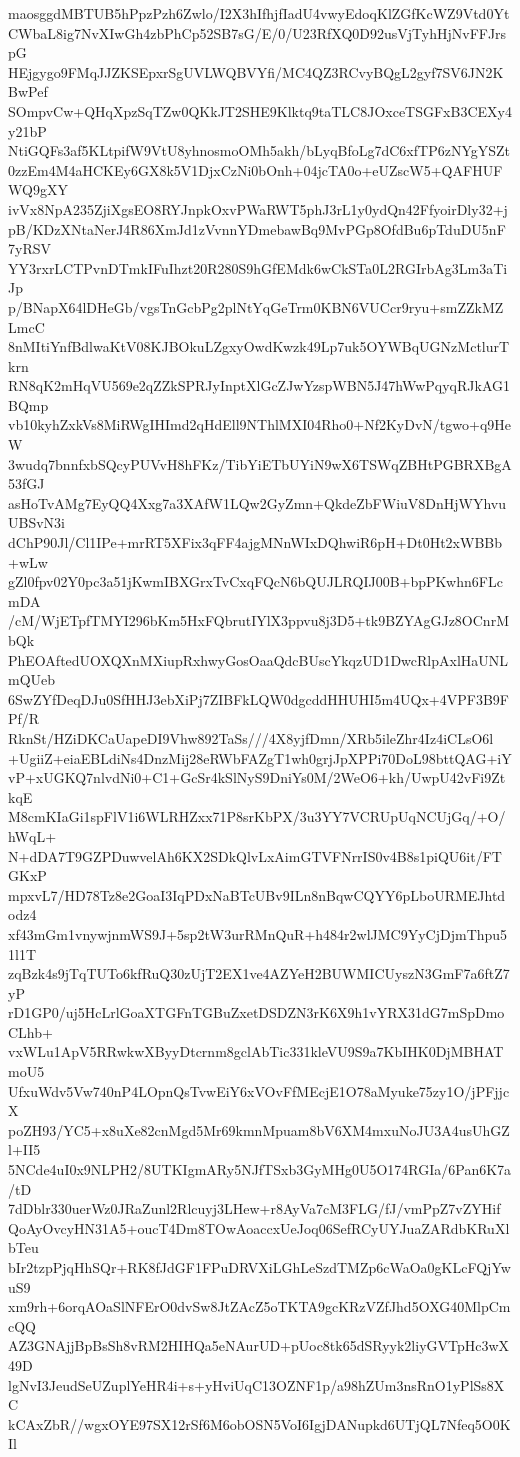 maosggdMBTUB5hPpzPzh6Zwlo/I2X3hIfhjfIadU4vwyEdoqKlZGfKcWZ9Vtd0Yt
CWbaL8ig7NvXIwGh4zbPhCp52SB7sG/E/0/U23RfXQ0D92usVjTyhHjNvFFJrspG
HEjgygo9FMqJJZKSEpxrSgUVLWQBVYfi/MC4QZ3RCvyBQgL2gyf7SV6JN2KBwPef
SOmpvCw+QHqXpzSqTZw0QKkJT2SHE9Klktq9taTLC8JOxceTSGFxB3CEXy4y21bP
NtiGQFs3af5KLtpifW9VtU8yhnosmoOMh5akh/bLyqBfoLg7dC6xfTP6zNYgYSZt
0zzEm4M4aHCKEy6GX8k5V1DjxCzNi0bOnh+04jcTA0o+eUZscW5+QAFHUFWQ9gXY
ivVx8NpA235ZjiXgsEO8RYJnpkOxvPWaRWT5phJ3rL1y0ydQn42FfyoirDly32+j
pB/KDzXNtaNerJ4R86XmJd1zVvnnYDmebawBq9MvPGp8OfdBu6pTduDU5nF7yRSV
YY3rxrLCTPvnDTmkIFuIhzt20R280S9hGfEMdk6wCkSTa0L2RGIrbAg3Lm3aTiJp
p/BNapX64lDHeGb/vgsTnGcbPg2plNtYqGeTrm0KBN6VUCcr9ryu+smZZkMZLmcC
8nMItiYnfBdlwaKtV08KJBOkuLZgxyOwdKwzk49Lp7uk5OYWBqUGNzMctlurTkrn
RN8qK2mHqVU569e2qZZkSPRJyInptXlGcZJwYzspWBN5J47hWwPqyqRJkAG1BQmp
vb10kyhZxkVs8MiRWgIHImd2qHdEll9NThlMXI04Rho0+Nf2KyDvN/tgwo+q9HeW
3wudq7bnnfxbSQcyPUVvH8hFKz/TibYiETbUYiN9wX6TSWqZBHtPGBRXBgA53fGJ
asHoTvAMg7EyQQ4Xxg7a3XAfW1LQw2GyZmn+QkdeZbFWiuV8DnHjWYhvuUBSvN3i
dChP90Jl/Cl1IPe+mrRT5XFix3qFF4ajgMNnWIxDQhwiR6pH+Dt0Ht2xWBBb+wLw
gZl0fpv02Y0pc3a51jKwmIBXGrxTvCxqFQcN6bQUJLRQIJ00B+bpPKwhn6FLcmDA
/cM/WjETpfTMYI296bKm5HxFQbrutIYlX3ppvu8j3D5+tk9BZYAgGJz8OCnrMbQk
PhEOAftedUOXQXnMXiupRxhwyGosOaaQdcBUscYkqzUD1DwcRlpAxlHaUNLmQUeb
6SwZYfDeqDJu0SfHHJ3ebXiPj7ZIBFkLQW0dgcddHHUHI5m4UQx+4VPF3B9FPf/R
RknSt/HZiDKCaUapeDI9Vhw892TaSs///4X8yjfDmn/XRb5ileZhr4Iz4iCLsO6l
+UgiiZ+eiaEBLdiNs4DnzMij28eRWbFAZgT1wh0grjJpXPPi70DoL98bttQAG+iY
vP+xUGKQ7nlvdNi0+C1+GcSr4kSlNyS9DniYs0M/2WeO6+kh/UwpU42vFi9ZtkqE
M8cmKIaGi1spFlV1i6WLRHZxx71P8srKbPX/3u3YY7VCRUpUqNCUjGq/+O/hWqL+
N+dDA7T9GZPDuwvelAh6KX2SDkQlvLxAimGTVFNrrIS0v4B8s1piQU6it/FTGKxP
mpxvL7/HD78Tz8e2GoaI3IqPDxNaBTcUBv9ILn8nBqwCQYY6pLboURMEJhtdodz4
xf43mGm1vnywjnmWS9J+5sp2tW3urRMnQuR+h484r2wlJMC9YyCjDjmThpu51l1T
zqBzk4s9jTqTUTo6kfRuQ30zUjT2EX1ve4AZYeH2BUWMICUyszN3GmF7a6ftZ7yP
rD1GP0/uj5HcLrlGoaXTGFnTGBuZxetDSDZN3rK6X9h1vYRX31dG7mSpDmoCLhb+
vxWLu1ApV5RRwkwXByyDtcrnm8gclAbTic331kleVU9S9a7KbIHK0DjMBHATmoU5
UfxuWdv5Vw740nP4LOpnQsTvwEiY6xVOvFfMEcjE1O78aMyuke75zy1O/jPFjjcX
poZH93/YC5+x8uXe82cnMgd5Mr69kmnMpuam8bV6XM4mxuNoJU3A4usUhGZl+II5
5NCde4uI0x9NLPH2/8UTKIgmARy5NJfTSxb3GyMHg0U5O174RGIa/6Pan6K7a/tD
7dDblr330uerWz0JRaZunl2Rlcuyj3LHew+r8AyVa7cM3FLG/fJ/vmPpZ7vZYHif
QoAyOvcyHN31A5+oucT4Dm8TOwAoaccxUeJoq06SefRCyUYJuaZARdbKRuXlbTeu
bIr2tzpPjqHhSQr+RK8fJdGF1FPuDRVXiLGhLeSzdTMZp6cWaOa0gKLcFQjYwuS9
xm9rh+6orqAOaSlNFErO0dvSw8JtZAcZ5oTKTA9gcKRzVZfJhd5OXG40MlpCmcQQ
AZ3GNAjjBpBsSh8vRM2HIHQa5eNAurUD+pUoc8tk65dSRyyk2liyGVTpHc3wX49D
lgNvI3JeudSeUZuplYeHR4i+s+yHviUqC13OZNF1p/a98hZUm3nsRnO1yPlSs8XC
kCAxZbR//wgxOYE97SX12rSf6M6obOSN5VoI6IgjDANupkd6UTjQL7Nfeq5O0KIl

